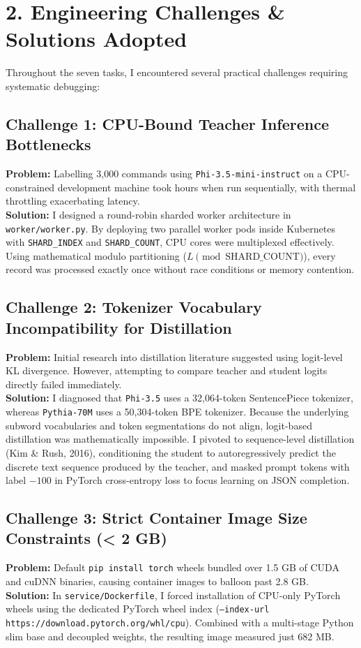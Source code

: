 \documentclass[11pt,a4paper]{article}
\begin{document}
\newpage

\section*{2. Engineering Challenges \& Solutions Adopted}

Throughout the seven tasks, I encountered several practical challenges requiring systematic debugging:

\subsection*{Challenge 1: CPU-Bound Teacher Inference Bottlenecks}
\textbf{Problem:} Labelling 3,000 commands using \texttt{Phi-3.5-mini-instruct} on a CPU-constrained development machine took hours when run sequentially, with thermal throttling exacerbating latency.\\
\textbf{Solution:} I designed a round-robin sharded worker architecture in \texttt{worker/worker.py}. By deploying two parallel worker pods inside Kubernetes with \texttt{SHARD\_INDEX} and \texttt{SHARD\_COUNT}, CPU cores were multiplexed effectively. Using mathematical modulo partitioning ($L \pmod{\text{SHARD\_COUNT}}$), every record was processed exactly once without race conditions or memory contention.

\subsection*{Challenge 2: Tokenizer Vocabulary Incompatibility for Distillation}
\textbf{Problem:} Initial research into distillation literature suggested using logit-level KL divergence. However, attempting to compare teacher and student logits directly failed immediately.\\
\textbf{Solution:} I diagnosed that \texttt{Phi-3.5} uses a 32,064-token SentencePiece tokenizer, whereas \texttt{Pythia-70M} uses a 50,304-token BPE tokenizer. Because the underlying subword vocabularies and token segmentations do not align, logit-based distillation was mathematically impossible. I pivoted to sequence-level distillation (Kim \& Rush, 2016), conditioning the student to autoregressively predict the discrete text sequence produced by the teacher, and masked prompt tokens with label $-100$ in PyTorch cross-entropy loss to focus learning on JSON completion.

\subsection*{Challenge 3: Strict Container Image Size Constraints (< 2 GB)}
\textbf{Problem:} Default \texttt{pip install torch} wheels bundled over 1.5 GB of CUDA and cuDNN binaries, causing container images to balloon past 2.8 GB.\\
\textbf{Solution:} In \texttt{service/Dockerfile}, I forced installation of CPU-only PyTorch wheels using the dedicated PyTorch wheel index (\texttt{--index-url https://download.pytorch.org/whl/cpu}). Combined with a multi-stage Python slim base and decoupled weights, the resulting image measured just 682 MB.
\end{document}
